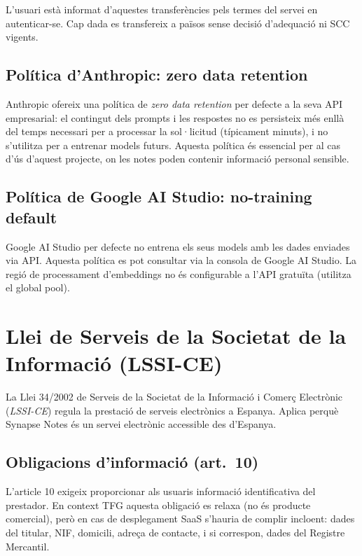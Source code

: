 L'usuari està informat d'aquestes transferències pels termes del servei en autenticar-se. Cap dada es transfereix a països sense decisió d'adequació ni SCC vigents.

\subsection{Política d'Anthropic: zero data retention}

Anthropic ofereix una política de \emph{zero data retention} per defecte a la seva API empresarial: el contingut dels prompts i les respostes no es persisteix més enllà del temps necessari per a processar la sol·licitud (típicament minuts), i no s'utilitza per a entrenar models futurs. Aquesta política és essencial per al cas d'ús d'aquest projecte, on les notes poden contenir informació personal sensible.

\subsection{Política de Google AI Studio: no-training default}

Google AI Studio per defecte no entrena els seus models amb les dades enviades via API. Aquesta política es pot consultar via la consola de Google AI Studio. La regió de processament d'embeddings no és configurable a l'API gratuïta (utilitza el global pool).

\section{Llei de Serveis de la Societat de la Informació (LSSI-CE)}
\label{sec:lssi}

La Llei 34/2002 de Serveis de la Societat de la Informació i Comerç Electrònic (\emph{LSSI-CE}) regula la prestació de serveis electrònics a Espanya. Aplica perquè Synapse Notes és un servei electrònic accessible des d'Espanya.

\subsection{Obligacions d'informació (art.~10)}

L'article 10 exigeix proporcionar als usuaris informació identificativa del prestador. En context TFG aquesta obligació es relaxa (no és producte comercial), però en cas de desplegament SaaS s'hauria de complir incloent: dades del titular, NIF, domicili, adreça de contacte, i si correspon, dades del Registre Mercantil.

